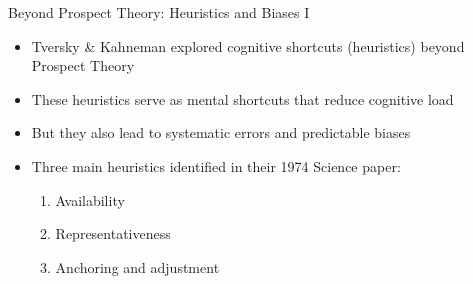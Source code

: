 \documentclass[10pt]{beamer}
\begin{document}

\begin{frame}{Beyond Prospect Theory: Heuristics and Biases I}
  \begin{itemize}[<+->]
    \item Tversky \& Kahneman explored cognitive shortcuts (heuristics) beyond Prospect Theory
    \item These heuristics serve as mental shortcuts that reduce cognitive load
    \item But they also lead to systematic errors and predictable biases
    \item Three main heuristics identified in their 1974 Science paper:
      \begin{enumerate}
        \item Availability
        \item Representativeness 
        \item Anchoring and adjustment
      \end{enumerate}
  \end{itemize}
\end{frame}
\end{document}
